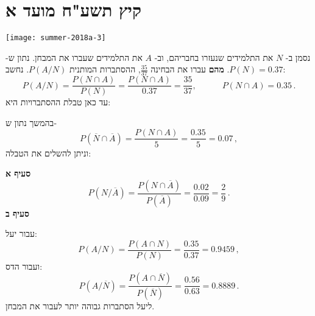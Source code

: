 \np
\section{קיץ תשע"ח מועד א}

\begin{center}
\texttt{[image: summer-2018a-3]}
\end{center}
נסמן ב-%
$N$
את התלמידים שנעזרו בחבריהם, וב-%
$A$
את התלמידים שעברו את המבחן. נתון ש-%
$P(N)=0.37$.
\textbf{מהם}
עברו את הבחינה 
$\displaystyle\frac{35}{37}$,
ההסתברות המותנית
$P(A/N)$.
נחשב:
\[
P(A/N) = \frac{P(N\cap A)}{P(N)} = \frac{P(N\cap A)}{0.37}=\frac{35}{37},\quad\quad\quad P(N\cap A)=0.35\,.
\]
עד כאן טבלת ההסתברויות היא:
\begin{center}
\end{center}
בהמשך נתון ש-%
\[
P(\overline{N}\cap\overline{A})=\frac{P(N\cap A)}{5}=\frac{0.35}{5}=0.07\,,
\]
וניתן להשלים את הטבלה:
\begin{center}
\end{center}
\textbf{סעיף א}
\[
P(N/\overline{A})=\frac{P(N\cap \overline{A})}{P(\overline{A})}=\frac{0.02}{0.09}=\frac{2}{9}\,.
\]
\textbf{סעיף ב}

עבור יעל:
\[
P(A/N)=\frac{P(A \cap N)}{P(N)}=\frac{0.35}{0.37}=0.9459\,,
\]
ועבור הדס:
\[
P(A/\overline{N})=\frac{P(A\cap \overline{N})}{P(\overline{N})}=\frac{0.56}{0.63}=0.8889\,.
\]
ליעל הסתברות גבוהה יותר לעבור את המבחן.

